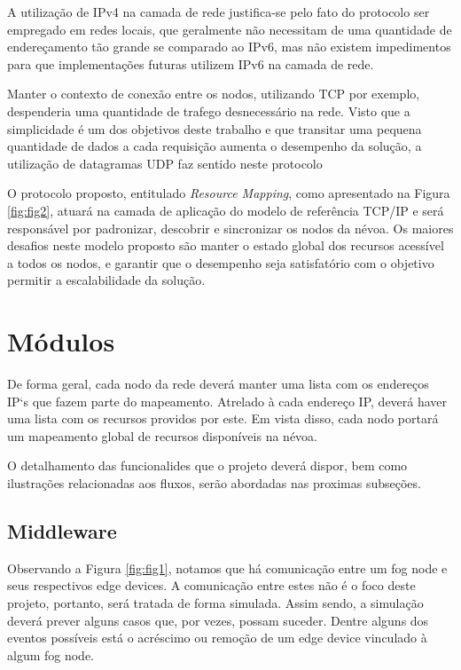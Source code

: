A utilização de IPv4 na camada de rede justifica-se pelo fato do protocolo ser empregado em redes locais, que geralmente não necessitam de uma quantidade de endereçamento tão grande 
se comparado ao IPv6, mas não existem impedimentos para que implementações futuras utilizem IPv6 na camada de rede.

Manter o contexto de conexão entre os nodos, utilizando TCP por exemplo, despenderia uma quantidade de trafego desnecessário na rede.
Visto que a simplicidade é um dos objetivos deste trabalho e que transitar uma pequena quantidade de dados a cada requisição aumenta o desempenho da solução,
a utilização de datagramas UDP faz sentido neste protocolo

O protocolo proposto, entitulado \textit{Resource Mapping}, como apresentado na Figura \ref{fig:fig2}, atuará na camada de aplicação do modelo de referência TCP/IP \cite{tanenbaum2011redes} e será responsável por padronizar, descobrir e sincronizar os nodos da névoa.
Os maiores desafios neste modelo proposto são manter o estado global dos recursos acessível a todos os nodos, e garantir que o desempenho seja satisfatório com o objetivo permitir a escalabilidade da solução.



\section{Módulos}

De forma geral, cada nodo da rede deverá manter uma lista com os endereços IP`s que fazem parte do mapeamento.
Atrelado à cada endereço IP, deverá haver uma lista com os recursos providos por este.
Em vista disso, cada nodo portará um mapeamento global de recursos disponíveis na névoa.

O detalhamento das funcionalides que o projeto deverá dispor, bem como ilustrações relacionadas aos fluxos, serão abordadas nas proximas subseções.

\subsection{Middleware}

Observando a Figura \ref{fig:fig1}, notamos que há comunicação entre um fog node e seus respectivos edge devices.
A comunicação entre estes não é o foco deste projeto, portanto, será tratada de forma simulada.
Assim sendo, a simulação deverá prever alguns casos que, por vezes, possam suceder. Dentre alguns dos eventos possíveis está
o acréscimo ou remoção de um edge device vinculado à algum fog node.

